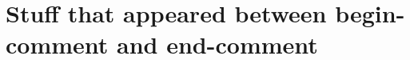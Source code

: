 \documentclass[12pt,a4paper]{article}
\newcounter{arrow}
\newcommand{\ra}{\rightarrow}
\newcommand\be            {\begin{equation}}
\newcommand\ee            {\end{equation}}
\newcommand{\End}{\text{End}}
\newcommand{\fube}{\textbf{Tube}}
\newcommand{\fld}{\mathcal{F}} %
\newcommand{\ethan}[1]{{\color{amethyst}\footnotesize{(EL) #1}}}
\begin{document}











\section{Stuff that appeared between begin-comment and end-comment}

 
 
\end{document}
